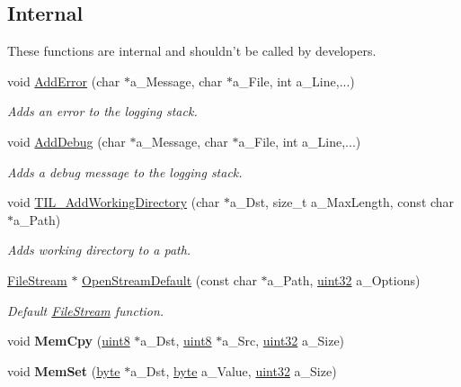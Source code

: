 \subsection*{Internal}
\label{_amgrpafbf0897a5a83fdd873dfb032ec695d3}
 These functions are internal and shouldn't be called by developers. \begin{DoxyCompactItemize}
\item 
void \hyperlink{namespacetil_aa6707f7c58f2d8c74a738b2b82c03839}{AddError} (char $\ast$a\_\-Message, char $\ast$a\_\-File, int a\_\-Line,...)
\begin{DoxyCompactList}\small\item\em Adds an error to the logging stack. \item\end{DoxyCompactList}\item 
void \hyperlink{namespacetil_a05cbf3cec4ec5403459576050149a4ee}{AddDebug} (char $\ast$a\_\-Message, char $\ast$a\_\-File, int a\_\-Line,...)
\begin{DoxyCompactList}\small\item\em Adds a debug message to the logging stack. \item\end{DoxyCompactList}\item 
void \hyperlink{namespacetil_a0a78aac0d1be8f1403da0a7eff6334ca}{TIL\_\-AddWorkingDirectory} (char $\ast$a\_\-Dst, size\_\-t a\_\-MaxLength, const char $\ast$a\_\-Path)
\begin{DoxyCompactList}\small\item\em Adds working directory to a path. \item\end{DoxyCompactList}\item 
\hyperlink{classtil_1_1_file_stream}{FileStream} $\ast$ \hyperlink{namespacetil_afb60962bb4c5724077d6424a7ab60737}{OpenStreamDefault} (const char $\ast$a\_\-Path, \hyperlink{namespacetil_a20db61688ed403d11f057a508d87e54c}{uint32} a\_\-Options)
\begin{DoxyCompactList}\small\item\em Default \hyperlink{classtil_1_1_file_stream}{FileStream} function. \item\end{DoxyCompactList}\item 
\hypertarget{namespacetil_a2d92aa4d6b94833cc5c2d2e098cbaafd}{
void {\bfseries MemCpy} (\hyperlink{namespacetil_a7a75b0e7e2cd3f19ea51c8c02fd242f8}{uint8} $\ast$a\_\-Dst, \hyperlink{namespacetil_a7a75b0e7e2cd3f19ea51c8c02fd242f8}{uint8} $\ast$a\_\-Src, \hyperlink{namespacetil_a20db61688ed403d11f057a508d87e54c}{uint32} a\_\-Size)}
\label{namespacetil_a2d92aa4d6b94833cc5c2d2e098cbaafd}

\item 
\hypertarget{namespacetil_a6b048ea80480b6a208efde7401c27fb4}{
void {\bfseries MemSet} (\hyperlink{namespacetil_a5f3ec10aca1a788b495a0bd3787bc2dc}{byte} $\ast$a\_\-Dst, \hyperlink{namespacetil_a5f3ec10aca1a788b495a0bd3787bc2dc}{byte} a\_\-Value, \hyperlink{namespacetil_a20db61688ed403d11f057a508d87e54c}{uint32} a\_\-Size)}
\label{namespacetil_a6b048ea80480b6a208efde7401c27fb4}

\end{DoxyCompactItemize}


